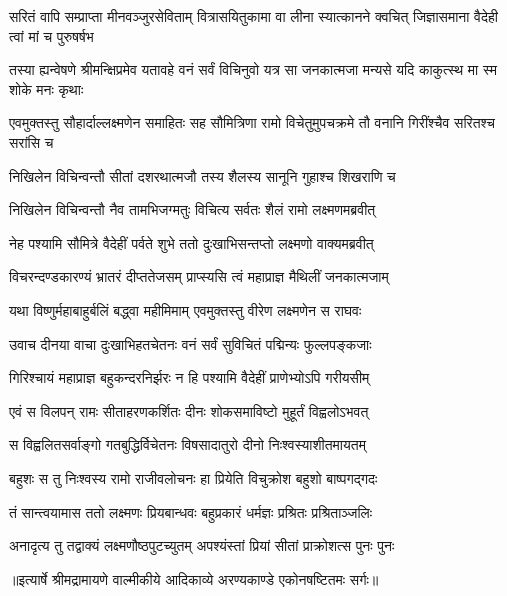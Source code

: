 \threelineshloka
{सरितं वापि सम्प्राप्ता मीनवञ्जुरसेविताम्}
{वित्रासयितुकामा वा लीना स्यात्कानने क्वचित्}
{जिज्ञासमाना वैदेही त्वां मां च पुरुषर्षभ} %

\threelineshloka
{तस्या ह्यन्वेषणे श्रीमन्क्षिप्रमेव यतावहे}
{वनं सर्वं विचिनुवो यत्र सा जनकात्मजा}
{मन्यसे यदि काकुत्स्थ मा स्म शोके मनः कृथाः} %

\threelineshloka
{एवमुक्तस्तु सौहार्दाल्लक्ष्मणेन समाहितः}
{सह सौमित्रिणा रामो विचेतुमुपचक्रमे}
{तौ वनानि गिरींश्चैव सरितश्च सरांसि च} %

\twolineshloka
{निखिलेन विचिन्वन्तौ सीतां दशरथात्मजौ}
{तस्य शैलस्य सानूनि गुहाश्च शिखराणि च} %

\twolineshloka
{निखिलेन विचिन्वन्तौ नैव तामभिजग्मतुः}
{विचित्य सर्वतः शैलं रामो लक्ष्मणमब्रवीत्} %

\twolineshloka
{नेह पश्यामि सौमित्रे वैदेहीं पर्वते शुभे}
{ततो दुःखाभिसन्तप्तो लक्ष्मणो वाक्यमब्रवीत्} %

\twolineshloka
{विचरन्दण्डकारण्यं भ्रातरं दीप्ततेजसम्}
{प्राप्स्यसि त्वं महाप्राज्ञ मैथिलीं जनकात्मजाम्} %

\twolineshloka
{यथा विष्णुर्महाबाहुर्बलिं बद्ध्वा महीमिमाम्}
{एवमुक्तस्तु वीरेण लक्ष्मणेन स राघवः} %

\twolineshloka
{उवाच दीनया वाचा दुःखाभिहतचेतनः}
{वनं सर्वं सुविचितं पद्मिन्यः फुल्लपङ्कजाः} %

\twolineshloka
{गिरिश्चायं महाप्राज्ञ बहुकन्दरनिर्झरः}
{न हि पश्यामि वैदेहीं प्राणेभ्योऽपि गरीयसीम्} %

\twolineshloka
{एवं स विलपन् रामः सीताहरणकर्शितः}
{दीनः शोकसमाविष्टो मुहूर्तं विह्वलोऽभवत्} %

\twolineshloka
{स विह्वलितसर्वाङ्गो गतबुद्धिर्विचेतनः}
{विषसादातुरो दीनो निःश्वस्याशीतमायतम्} %

\twolineshloka
{बहुशः स तु निःश्वस्य रामो राजीवलोचनः}
{हा प्रियेति विचुक्रोश बहुशो बाष्पगद्गदः} %

\twolineshloka
{तं सान्त्वयामास ततो लक्ष्मणः प्रियबान्धवः}
{बहुप्रकारं धर्मज्ञः प्रश्रितः प्रश्रिताञ्जलिः} %

\twolineshloka
{अनादृत्य तु तद्वाक्यं लक्ष्मणौष्ठपुटच्युतम्}
{अपश्यंस्तां प्रियां सीतां प्राक्रोशत्स पुनः पुनः} %


{॥इत्यार्षे श्रीमद्रामायणे वाल्मीकीये आदिकाव्ये अरण्यकाण्डे एकोनषष्टितमः सर्गः॥}


